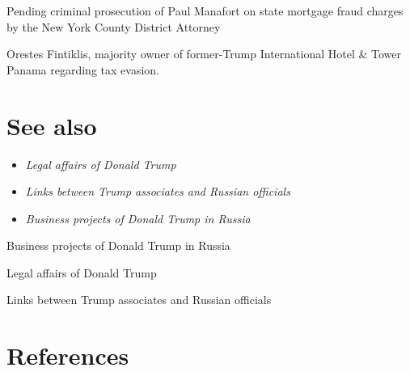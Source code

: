 Pending criminal prosecution of Paul Manafort on state mortgage fraud
charges by the New York County District Attorney

Orestes Fintiklis, majority owner of former-Trump International Hotel \&
Tower Panama regarding tax evasion.

\section{See also}\label{see-also}

\begin{itemize}
\item
  \emph{Legal affairs of Donald Trump}
\item
  \emph{Links between Trump associates and Russian officials}
\item
  \emph{Business projects of Donald Trump in Russia}
\end{itemize}

Business projects of Donald Trump in Russia

Legal affairs of Donald Trump

Links between Trump associates and Russian officials

\section{References}\label{references}
